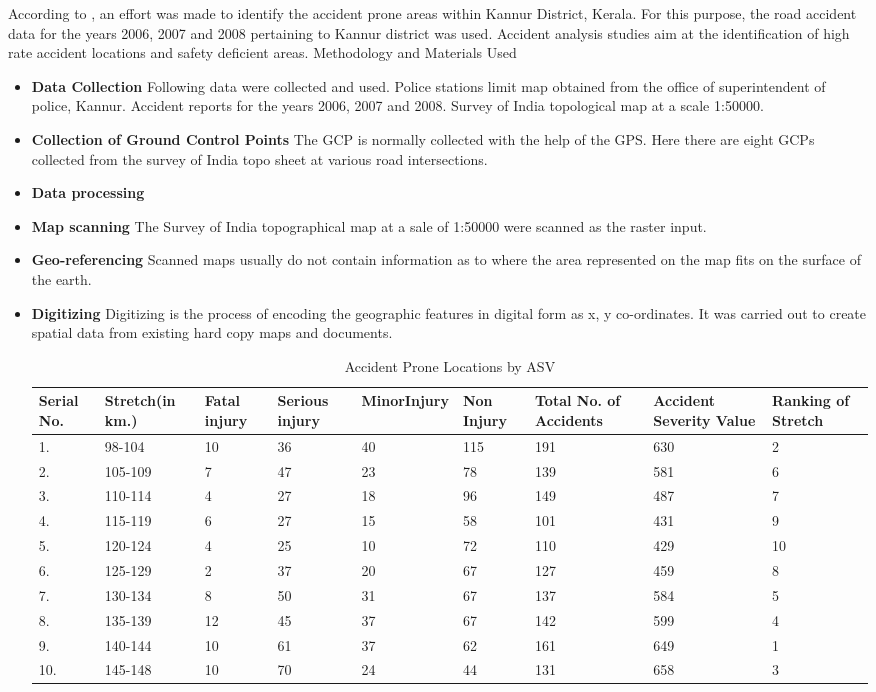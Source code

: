 \documentclass[journal]{IEEEtran}
\begin{document}
According to \cite{hots}, an effort was made to identify the accident prone areas within Kannur District, Kerala. For this purpose, the road accident data for the years 2006, 2007 and 2008 pertaining to Kannur district was used. Accident analysis studies aim at the identification of high rate accident locations and safety deficient areas. 
Methodology and Materials Used 
\begin{itemize}
	\item\textbf{Data Collection}
	Following data were collected and used. 
	Police stations limit map obtained from the office of superintendent of police, Kannur.
	Accident reports for the years 2006, 2007 and 2008.
	Survey of India topological map at a scale 1:50000.
	\item\textbf{Collection of Ground Control Points}
	The GCP is normally collected with the help of the GPS. Here there are eight GCPs collected from the survey of India topo sheet at various road intersections.
	\item\textbf{Data processing}
	\item\textbf{Map scanning}
	The Survey of India topographical map at a sale of 1:50000 were scanned as the raster input.
	\item\textbf{Geo-referencing}
	Scanned maps usually do not contain information as to where the area represented on the map fits on the surface of the earth.
	\item\textbf{Digitizing}
	Digitizing is the process of encoding the geographic features in digital form as x, y co-ordinates. It was carried out to create spatial data from existing hard copy maps and documents.
	\begin{table}[ht]
		\caption{Accident Prone Locations by ASV}
		\centering
		\setlength{\tabcolsep}{8pt}
		\renewcommand{\arraystretch}{1}
		\begin{tabular}{|p{1cm}|p{2cm}|p{1cm}|p{1.5cm}|p{1cm}|p{1cm}|p{1cm}|p{2cm}|p{2cm}|}
			\hline
			\textbf{Serial No.}& \textbf{Stretch(in km.)} & \textbf{Fatal injury} & \textbf{Serious injury} & \textbf{Minor\newline Injury} & \textbf{Non Injury} & \textbf{Total No. of Accidents} & \textbf{Accident Severity Value} & \textbf{Ranking of Stretch}\\
			\hline
			1. & 98-104 & 10 & 36 & 40 & 115 & 191 & 630 & 2\\
			2. & 105-109 & 7 & 47 & 23 & 78 & 139 & 581 & 6 \\
			3. & 110-114 & 4 & 27 & 18 & 96 & 149 & 487 & 7\\
			4. & 115-119 & 6 & 27 & 15 & 58 & 101 & 431 & 9\\
			5. & 120-124 & 4 & 25 & 10 & 72 & 110 & 429 & 10\\
			6. & 125-129 & 2 & 37 & 20 & 67 & 127 & 459 & 8\\
			7. & 130-134 & 8 & 50 & 31 & 67 & 137 & 584 & 5\\
			8. & 135-139 & 12 & 45 & 37 & 67 & 142 & 599 & 4\\
			9. & 140-144 & 10 & 61 & 37 & 62 & 161 & 649 & 1\\
			10. & 145-148 & 10 & 70 & 24 & 44 & 131 & 658 & 3\\
			

\end{tabular}
\end{table}
\end{itemize}
\end{document}

